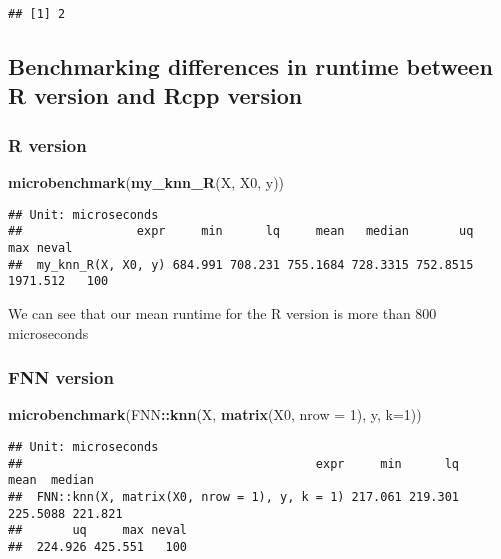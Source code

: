 \documentclass[]{article}
\newenvironment{Shaded}{\begin{snugshade}}{\end{snugshade}}
\newcommand{\DataTypeTok}[1]{\textcolor[rgb]{0.13,0.29,0.53}{#1}}
\newcommand{\DecValTok}[1]{\textcolor[rgb]{0.00,0.00,0.81}{#1}}
\newcommand{\KeywordTok}[1]{\textcolor[rgb]{0.13,0.29,0.53}{\textbf{#1}}}
\newcommand{\NormalTok}[1]{#1}
\newcommand{\OperatorTok}[1]{\textcolor[rgb]{0.81,0.36,0.00}{\textbf{#1}}}
\begin{document}
\begin{verbatim}
## [1] 2
\end{verbatim}

\hypertarget{benchmarking-differences-in-runtime-between-r-version-and-rcpp-version}{%
\subsection{Benchmarking differences in runtime between R version and
Rcpp
version}\label{benchmarking-differences-in-runtime-between-r-version-and-rcpp-version}}

\hypertarget{r-version}{%
\subsubsection{R version}\label{r-version}}

\begin{Shaded}
\begin{Highlighting}[]
\KeywordTok{microbenchmark}\NormalTok{(}\KeywordTok{my_knn_R}\NormalTok{(X, X0, y))}
\end{Highlighting}
\end{Shaded}

\begin{verbatim}
## Unit: microseconds
##                expr     min      lq     mean   median       uq      max neval
##  my_knn_R(X, X0, y) 684.991 708.231 755.1684 728.3315 752.8515 1971.512   100
\end{verbatim}

We can see that our mean runtime for the R version is more than 800
microseconds

\hypertarget{fnn-version}{%
\subsubsection{FNN version}\label{fnn-version}}

\begin{Shaded}
\begin{Highlighting}[]
\KeywordTok{microbenchmark}\NormalTok{(FNN}\OperatorTok{::}\KeywordTok{knn}\NormalTok{(X, }\KeywordTok{matrix}\NormalTok{(X0, }\DataTypeTok{nrow =} \DecValTok{1}\NormalTok{), y, }\DataTypeTok{k=}\DecValTok{1}\NormalTok{))}
\end{Highlighting}
\end{Shaded}

\begin{verbatim}
## Unit: microseconds
##                                         expr     min      lq     mean  median
##  FNN::knn(X, matrix(X0, nrow = 1), y, k = 1) 217.061 219.301 225.5088 221.821
##       uq     max neval
##  224.926 425.551   100
\end{verbatim}
\end{document}

